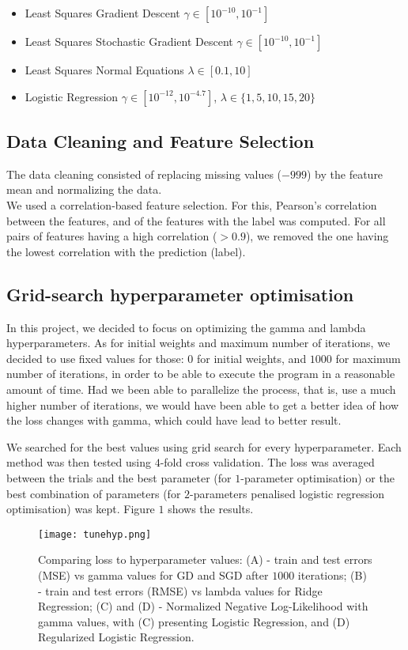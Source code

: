 \documentclass{article}
\begin{document}
		\begin{itemize}
			\item Least Squares Gradient Descent $\gamma \in [10^{-10}, 10^{-1}]$
			\item Least Squares Stochastic Gradient Descent $\gamma \in [10^{-10}, 10^{-1}]$
			\item Least Squares Normal Equations $\lambda \in [0.1, 10]$
			\item Logistic Regression $\gamma \in [10^{-12}, 10^{-4.7}]$, $\lambda \in \{1, 5, 10, 15, 20\} $
		\end{itemize}


	\subsection{Data Cleaning and Feature Selection}
	The data cleaning consisted of replacing missing values ($-999$) by the feature mean and normalizing the data.
	\\
	We used a correlation-based feature selection. For this, Pearson’s correlation between the features, and of the features with the label was computed. For all pairs of features having a high correlation ($> 0.9$), we removed the one having the lowest correlation with the prediction (label).

	\subsection{Grid-search hyperparameter optimisation}
	In this project, we decided to focus on optimizing the gamma and lambda hyperparameters. As for initial weights and maximum number of iterations, we decided to use fixed values for those: $0$ for initial weights, and $1000$ for maximum number of iterations, in order to be able to execute the program in a reasonable amount of time. Had we been able to parallelize the process, that is, use a much higher number of iterations, we would have been able to get a better idea of how the loss changes with gamma, which could have lead to better result.

	We searched for the best values using grid search for every hyperparameter. Each method was then tested using $4$-fold cross validation. The loss was averaged between the trials and the best parameter (for $1$-parameter optimisation) or the best combination of parameters (for $2$-parameters penalised logistic regression optimisation) was kept. Figure $1$ shows the results.

	\begin{figure}\label{fig1}
		\centering
		\texttt{[image: tunehyp.png]}
		\caption{Comparing loss to hyperparameter values:
			(A) - train and test errors (MSE) vs gamma values for GD and SGD after $1000$ iterations;
			(B) - train and test errors (RMSE) vs lambda values for Ridge Regression;
			(C) and (D) - Normalized Negative Log-Likelihood with gamma values, with (C) presenting Logistic Regression, and (D) Regularized Logistic Regression.}
	\end{figure}
\end{document}
